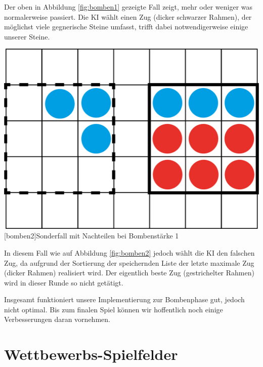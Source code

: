 \documentclass[12pt,a4paper,bibliography=totocnumbered,listof=totocnumbered]{scrartcl}
\begin{document}
	Der oben in Abbildung \ref{fig:bomben1} gezeigte Fall zeigt, mehr oder weniger was normalerweise passiert. Die KI wählt einen Zug (dicker schwarzer Rahmen), der möglichst viele gegnerische Steine umfasst, trifft dabei notwendigerweise einige unserer Steine.

	
	\vspace{1em}
	\begin{minipage}{\linewidth}
		\centering
		\includegraphics[width=0.6\linewidth]{pics/Kapitel_5/Kapitel_5_pic2.png}
		[bomben2]{Sonderfall mit Nachteilen bei Bombenstärke 1}
		\label{fig:bomben2}
	\end{minipage}
	\vspace{1em}
	
	In diesem Fall wie auf Abbildung \ref{fig:bomben2} jedoch wählt die KI den falschen Zug, da aufgrund der Sortierung der speichernden Liste der letzte maximale Zug (dicker Rahmen) realisiert wird. Der eigentlich beste Zug (gestrichelter Rahmen) wird in dieser Runde so nicht getätigt.
	
	Insgesamt funktioniert unsere Implementierung zur Bombenphase gut, jedoch nicht optimal. Bis zum finalen Spiel können wir hoffentlich noch einige Verbesserungen daran vornehmen.
	
	\newpage
    
    \section{Wettbewerbs-Spielfelder}
    \vspace{1em}
\end{document}
